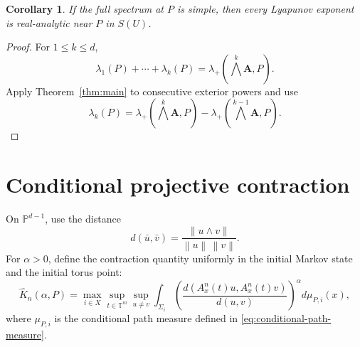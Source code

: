 \documentclass[11pt,a4paper]{amsart}
\newtheorem{corollary}[theorem]{Corollary}
\newcommand{\T}{\mathbb T}
\newcommand{\PP}{\mathbb P}
\newcommand{\norm}[1]{\left\lVert #1\right\rVert}
\begin{document}
\begin{corollary}\label{cor:all-exponents}
If the full spectrum at \(P\) is simple, then every Lyapunov exponent
is real-analytic near \(P\) in \(S(U)\).
\end{corollary}

\begin{proof}
For \(1\le k\le d\),
\[
 \lambda_1(P)+\cdots+\lambda_k(P)
 =\lambda_+\!\left(\bigwedge^k\mathbf A,P\right).
\]
Apply Theorem~\ref{thm:main} to consecutive exterior powers and use
\[
 \lambda_k(P)
 =\lambda_+\!\left(\bigwedge^k\mathbf A,P\right)
 -\lambda_+\!\left(\bigwedge^{k-1}\mathbf A,P\right).
\]
\end{proof}

\section{Conditional projective contraction}

On \(\PP^{d-1}\), use the distance
\[
 d(\bar u,\bar v)
 =\frac{\norm{u\wedge v}}{\norm u\,\norm v}.
\]
For \(\alpha>0\), define the contraction quantity uniformly in the
initial Markov state and the initial torus point:
\[
 \widehat K_n(\alpha,P)
 =\max_{i\in X}\sup_{t\in\T^m}\sup_{u\ne v}
 \int_{\Sigma_i}
 \left(
 \frac{d(A_x^n(t)u,A_x^n(t)v)}{d(u,v)}
 \right)^\alpha
 d\mu_{P,i}(x),
\]
where \(\mu_{P,i}\) is the conditional path measure defined in
\eqref{eq:conditional-path-measure}.

\end{document}
